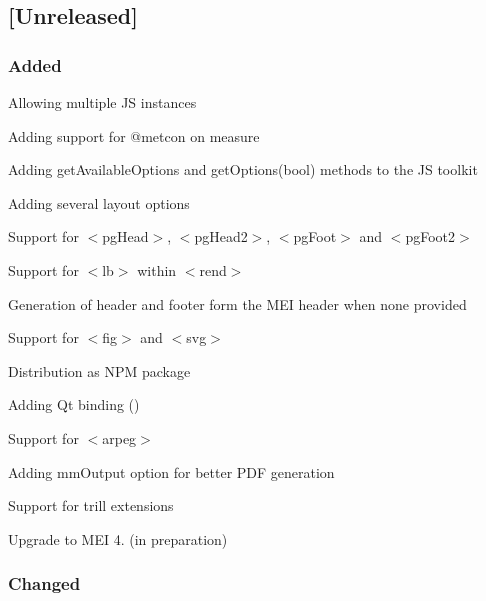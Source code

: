 \subsection*{\mbox{[}Unreleased\mbox{]}}

\subsubsection*{Added}


\begin{DoxyItemize}
\item Allowing multiple JS instances
\item Adding support for {\ttfamily @metcon} on measure
\item Adding get\+Available\+Options and get\+Options(bool) methods to the JS toolkit
\item Adding several layout options
\item Support for {\ttfamily $<$pg\+Head$>$}, {\ttfamily $<$pg\+Head2$>$}, {\ttfamily $<$pg\+Foot$>$} and {\ttfamily $<$pg\+Foot2$>$}
\item Support for {\ttfamily $<$lb$>$} within {\ttfamily $<$rend$>$}
\item Generation of header and footer form the M\+EI header when none provided
\item Support for {\ttfamily $<$fig$>$} and {\ttfamily $<$svg$>$}
\item Distribution as N\+PM package
\item Adding Qt binding ()
\item Support for {\ttfamily $<$arpeg$>$}
\item Adding mm\+Output option for better P\+DF generation
\item Support for trill extensions
\item Upgrade to M\+EI 4. (in preparation)
\end{DoxyItemize}

\subsubsection*{Changed}


